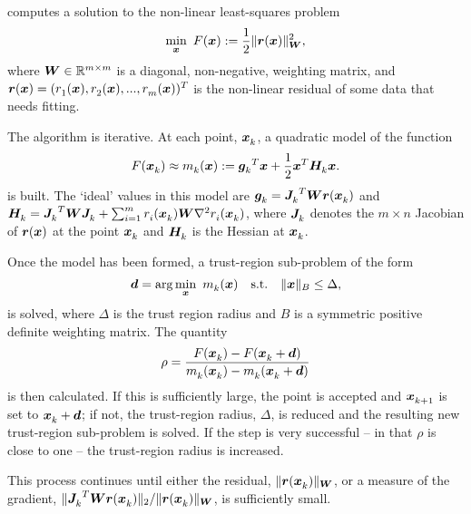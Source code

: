 {\tt \fullpackagename} computes a solution to the non-linear least-squares problem
\begin{equation}
\min_\vx \  F(\vx) := \frac{1}{2}\| \vr(\vx) \|_{\vW}^2,
\label{eq:nlls_problem}
\end{equation}
where $\vW\in\mathbb{R}^{m\times m}$ is a diagonal, non-negative, weighting matrix, and $\vr(\vx) =(\comp[1]{r}(\vx), \comp[2]{r}(\vx),...,\comp[m]{r}(\vx))^T$ is the non-linear residual of
some data that needs fitting.

The algorithm is iterative.
At each point, $\iter{\vx}$, a quadratic model of the function
\[
F(\iter{\vx}) \approx \iter{m}(\vx) := {\iter{\vg}}^T\vx + \frac{1}{2} {\vx}^T \iter{\vH} \vx.
\]
is built.
The `ideal' values in this model are $\iter{\vg} = {\iter{\vJ}}^T\vW\vr(\iter{\vx})$ and
$\iter{\vH} = {\iter{\vJ}}^T\vW\iter{\vJ} + \sum_{i = 1}^m \comp{r}(\iter{\vx}) \vW\nabla^2 \comp{r}(\iter{\vx})$,
where $\iter{\vJ}$ denotes the $m \times n$ Jacobian of $\vr(\vx)$ at the point $\iter{\vx}$
and $\iter{\vH}$ is the Hessian at $\iter{\vx}$.

Once the model has been formed, a trust-region sub-problem of the form
\begin{equation}
\vd = \arg \min_{\vx} \ \iter{m} (\vx) \quad \mathrm{s.t.} \quad  \|\vx\|_B \leq \Delta,\label{eq:tr_subproblem}
\end{equation}
is solved,
where $\Delta$ is the trust region radius and $B$ is a symmetric positive definite weighting matrix.
The quantity
\[\rho = \frac{F(\iter{\vx}) - F(\iter{\vx} + \vd)}{\iter{m}(\iter{\vx}) - \iter{m}(\iter{\vx} + \vd)}\]
is then calculated.
If this is sufficiently large, the point is accepted and  $\iter[k+1]{\vx}$ is set to $\iter{\vx} + \vd$; if not, the trust-region radius, $\Delta$,
is reduced and  the resulting new trust-region sub-problem is solved.  If the step is very successful -- in that $\rho$ is close to one --
the trust-region radius is increased.

This process continues until either the residual, $\|\vr(\iter{\vx})\|_\vW$, or a measure of the gradient,
$\|{\iter{\vJ}}^T\vW\vr(\iter{\vx})\|_2 / \|\vr(\iter{\vx})\|_\vW$, is sufficiently small.

